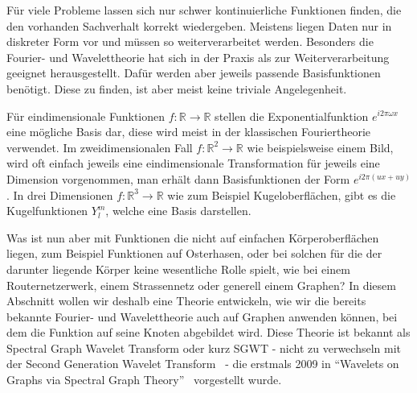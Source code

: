
F\"ur viele Probleme lassen sich nur schwer kontinuierliche Funktionen finden, 
die den vorhanden Sachverhalt korrekt wiedergeben. Meistens liegen Daten 
nur in diskreter Form vor und m\"ussen so weiterverarbeitet werden. Besonders 
die Fourier- und Wavelettheorie hat sich in der Praxis als zur 
Weiterverarbeitung geeignet herausgestellt. Daf\"ur werden aber jeweils 
passende Basisfunktionen ben\"otigt. Diese zu finden, ist aber meist keine 
triviale Angelegenheit.

F\"ur eindimensionale Funktionen $f: \mathbb{R} \rightarrow \mathbb{R}$ stellen 
die Exponentialfunktion $e^{i2\pi\omega x}$ eine m\"ogliche Basis dar, diese 
wird meist in der klassischen Fouriertheorie verwendet. Im 
zweidimensionalen Fall $f: \mathbb{R}^2 \rightarrow \mathbb{R}$ wie 
beispielsweise einem Bild, wird oft einfach jeweils eine eindimensionale 
Transformation f\"ur jeweils eine Dimension vorgenommen, man erh\"alt dann 
Basisfunktionen der Form $e^{i2\pi(ux+uy)}$. In drei Dimensionen $f: 
\mathbb{R}^3 \rightarrow \mathbb{R}$ wie zum Beispiel Kugeloberfl\"achen, gibt 
es die Kugelfunktionen $Y^m_l$, welche eine Basis darstellen.

Was ist nun aber mit Funktionen die nicht auf einfachen K\"orperoberfl\"achen 
liegen, zum Beispiel Funktionen auf Osterhasen, oder bei solchen f\"ur die der 
darunter liegende K\"orper keine wesentliche Rolle spielt, wie bei einem 
Routernetzerwerk, einem Strassennetz oder generell einem Graphen? In diesem 
Abschnitt wollen wir deshalb eine Theorie entwickeln, wie wir die bereits 
bekannte Fourier- und Wavelettheorie auch auf Graphen anwenden k\"onnen, bei 
dem die Funktion auf seine Knoten abgebildet wird. Diese Theorie ist bekannt 
als Spectral Graph Wavelet Transform oder kurz SGWT - nicht zu verwechseln mit 
der Second Generation Wavelet Transform~\cite{noauthor_second-generation_2018} 
- die erstmals 2009 in ``Wavelets on Graphs via Spectral Graph 
Theory''~\cite{hammond_wavelets_2009} 
vorgestellt wurde.
